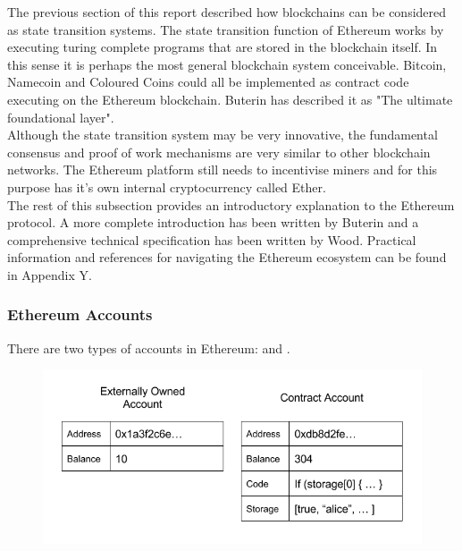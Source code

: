 The previous section of this report described how blockchains can be considered as state transition systems. The state transition function of Ethereum works by executing turing complete programs that are stored in the blockchain itself. In this sense it is perhaps the most general blockchain system conceivable. Bitcoin, Namecoin and Coloured Coins could all be implemented as contract code executing on the Ethereum blockchain. Buterin has described it as "The ultimate foundational layer"\cite{Ethereum}. \\

Although the state transition system may be very innovative, the fundamental consensus and proof of work mechanisms are very similar to other blockchain networks. The Ethereum platform still needs to incentivise miners and for this purpose has it's own internal cryptocurrency called Ether. \\

The rest of this subsection provides an introductory explanation to the Ethereum protocol. A more complete introduction has been written by Buterin\cite{Ethereum} and a comprehensive technical specification has been written by Wood\cite{wood2014ethereum}. Practical information and references for navigating the Ethereum ecosystem can be found in Appendix Y. \\

\subsubsection{Ethereum Accounts}
There are two types of accounts in Ethereum:  and . \\

\begin{figure}
\centering
\includegraphics[width=\textwidth]{Figures/ethereum_accounts}
\decoRule
\caption[]{}
\label{fig:ethereum_accounts}
\end{figure}

